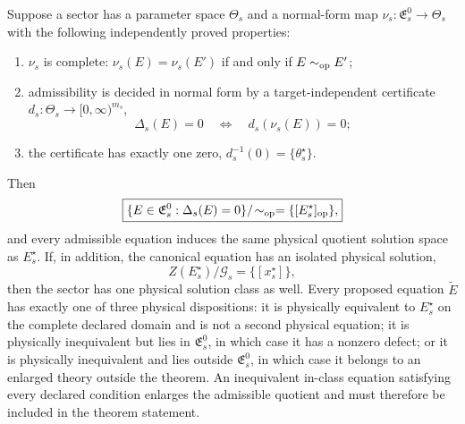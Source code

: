 \begin{theorem}
\label{thm:pr35-normal-form-exhaustion}
Suppose a sector has a parameter space $\Theta_s$ and a normal-form map
$\nu_s:\mathfrak E_s^0\to\Theta_s$ with the following independently proved
properties:
\begin{enumerate}
 \item $\nu_s$ is complete:
 $\nu_s(E)=\nu_s(E')$ if and only if $E\sim_{\rm op}E'$;
 \item admissibility is decided in normal form by a target-independent
 certificate $d_s:\Theta_s\to[0,\infty)^{m_s}$,
 \begin{equation}
  \Delta_s(E)=0
  \quad\Longleftrightarrow\quad
  d_s(\nu_s(E))=0;
 \end{equation}
 \item the certificate has exactly one zero,
 $d_s^{-1}(0)=\{\theta_s^\star\}$.
\end{enumerate}
Then
\begin{equation}
 \boxed{
 \{E\in\mathfrak E_s^0:\Delta_s(E)=0\}/\!\sim_{\rm op}
 =\{[E_s^\star]_{\rm op}\},}
 \label{eq:pr35-equation-class-singleton}
\end{equation}
and every admissible equation induces the same physical quotient solution
space as $E_s^\star$.  If, in addition, the canonical equation has an isolated
physical solution,
\begin{equation}
 Z(E_s^\star)/\mathcal G_s=\{[x_s^\star]\},
 \label{eq:pr35-canonical-solution-isolation}
\end{equation}
then the sector has one physical solution class as well.  Every proposed
equation $\widetilde E$ has exactly one of three physical dispositions:
it is physically equivalent to $E_s^\star$ on the complete declared domain
and is not a second physical equation; it is physically inequivalent but lies
in $\mathfrak E_s^0$, in which case it has a nonzero defect; or it is physically
inequivalent and lies outside $\mathfrak E_s^0$, in which case it belongs to an
enlarged theory outside the theorem.  An inequivalent in-class equation
satisfying every declared condition enlarges the admissible quotient and must
therefore be included in the theorem statement.
\end{theorem}

